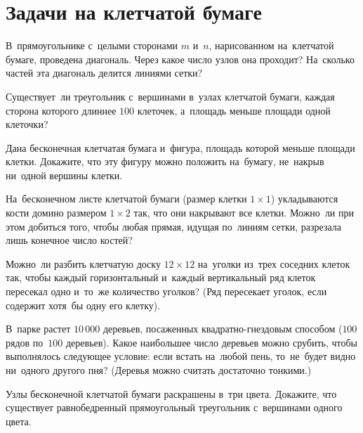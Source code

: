 
\section*{Задачи на клетчатой бумаге}


\begin{problems}

\item
В~прямоугольнике с~целыми сторонами $m$ и~$n$, нарисованном на~клетчатой
бумаге, проведена диагональ.
Через какое число узлов она проходит?
На~сколько частей эта диагональ делится линиями сетки?

\item
Существует~ли треугольник с~вершинами в~узлах клетчатой бумаги, каждая сторона
которого длиннее $100$ клеточек, а~площадь меньше площади одной клеточки?

\item
Дана бесконечная клетчатая бумага и~фигура, площадь которой меньше площади
клетки.
Докажите, что эту фигуру можно положить на~бумагу, не~накрыв ни~одной вершины
клетки.

\item
На~бесконечном листе клетчатой бумаги (размер клетки $1 \times 1$) укладываются
кости домино размером $1 \times 2$ так, что они накрывают все клетки.
Можно~ли при этом добиться того, чтобы любая прямая, идущая по~линиям сетки,
разрезала лишь конечное число костей?

\item
Можно~ли разбить клетчатую доску $12 \times 12$ на~уголки из~трех соседних
клеток так, чтобы каждый горизонтальный и~каждый вертикальный ряд клеток
пересекал одно и~то~же количество уголков?
(Ряд пересекает уголок, если содержит хотя~бы одну его клетку).

\item
В~парке растет $10\,000$ деревьев, посаженных квадратно-гнездовым способом
($100$ рядов по~$100$ деревьев).
Какое наибольшее число деревьев можно срубить, чтобы выполнялось следующее
условие: если встать на~любой пень, то~не~будет видно ни~одного другого пня?
(Деревья можно считать достаточно тонкими.)

\item
Узлы бесконечной клетчатой бумаги раскрашены в~три цвета.
Докажите, что существует равнобедренный прямоугольный треугольник с~вершинами
одного цвета.


\end{problems}

